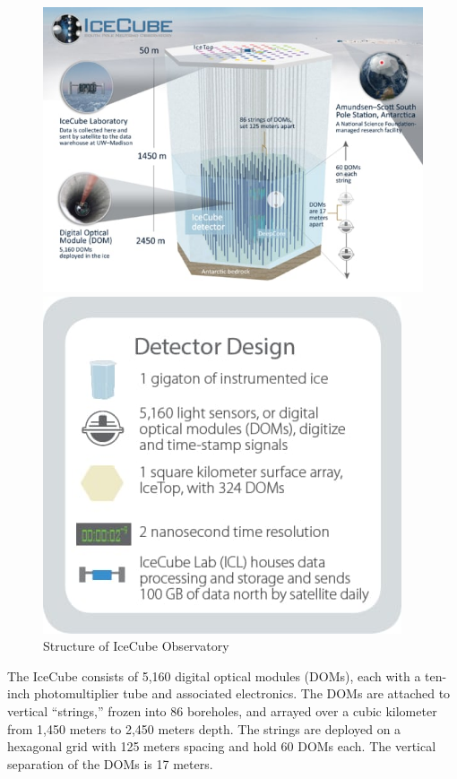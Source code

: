 \documentclass{article}
\begin{document}
\begin{figure}[htbp] %
	\centering
	\begin{minipage}{.5\textwidth}
		\centering
		\includegraphics[width=0.8\linewidth]{Images/icecube_detector_schematic.jpg}
	\end{minipage}%
	\begin{minipage}{.5\textwidth}
		\centering
		\includegraphics[width=0.65\linewidth]{Images/icecube_detector_design.jpg}
	\end{minipage}
	\caption*{Structure of IceCube Observatory}
\end{figure}
The %
IceCube consists of 5,160 digital optical modules (DOMs), each with a ten-inch photomultiplier tube and associated electronics. The DOMs are attached to vertical “strings,” frozen into 86 boreholes, and arrayed over a cubic kilometer from 1,450 meters to 2,450 meters depth. The strings are deployed on a hexagonal grid with 125 meters spacing and hold 60 DOMs each. The vertical separation of the DOMs is 17 meters.
\end{document}
